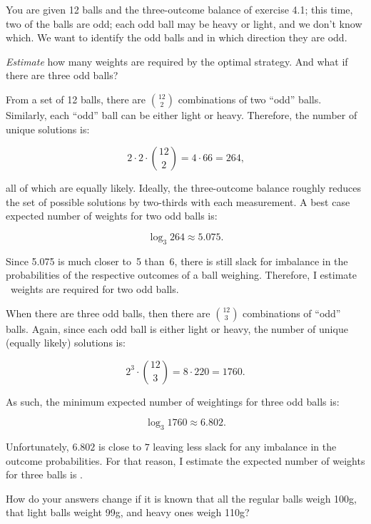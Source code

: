 \begin{problem}{4}{14}
  You are given 12 balls and the three-outcome balance of exercise 4.1; this time, two of the balls are odd; each odd ball may be heavy or light, and we don't know which.  We want to identify the odd balls and in which direction they are odd.
\end{problem}

\begin{subproblem}
  \textit{Estimate} how many weights are required by the optimal strategy.  And what if there are three odd balls?
\end{subproblem}

  From a set of 12 balls, there are $\binom{12}{2}$ combinations of two ``odd'' balls.  Similarly, each ``odd'' ball can be either light or heavy.  Therefore, the number of unique solutions is:

  \[ 2\cdot 2 \cdot \binom{12}{2} = 4 \cdot 66 = 264 \text{,} \]

  all of which are equally likely.  Ideally, the three-outcome balance roughly reduces the set of possible solutions by two-thirds with each measurement.  A best case expected number of weights for two odd balls is:

  \[ \log_{3} 264\approx 5.075 {.} \]

  Since 5.075 is much closer to~5 than~6, there is still slack for imbalance in the probabilities of the respective outcomes of a ball weighing.  Therefore, I estimate ~weights are required for two odd balls.

  When there are three odd balls, then there are $\binom{12}{3}$ combinations of ``odd'' balls.  Again, since each odd ball is either light or heavy, the number of unique (equally likely) solutions is:

  \[ 2^3 \cdot \binom{12}{3} = 8 \cdot 220 = 1760 \text{.} \]

  As such, the minimum expected number of weightings for three odd balls is:

  \[ \log_{3} 1760 \approx 6.802 \text{.} \]

  Unfortunately, $6.802$ is close to $7$ leaving less slack for any imbalance in the outcome probabilities.  For that reason, I estimate the expected number of weights for three balls is .

\begin{subproblem}
  How do your answers change if it is known that all the regular balls weigh 100g, that light balls weight 99g, and heavy ones weigh 110g?
\end{subproblem}


